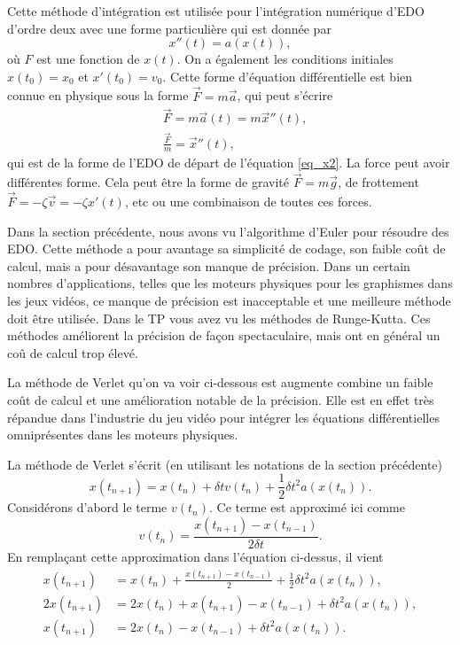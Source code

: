 \documentclass[a4paper,12pt]{book}
\renewcommand{\eqref}[1]{\ref{#1}}
\begin{document}
Cette méthode d'intégration est utilisée pour l'intégration numérique d'EDO d'ordre 
deux avec une forme particulière qui est donnée par
\begin{equation}
 x''(t)=a(x(t)),\label{eq_x2}
\end{equation}
où $F$ est une fonction de $x(t)$. On a également les conditions initiales
$x(t_0)=x_0$ et $x'(t_0)=v_0$. Cette forme d'équation différentielle
est bien connue en physique sous la forme $\vec F=m\vec a$, qui peut s'écrire
\begin{align}
 &\vec{F}=m \vec a(t)=m \vec x''(t),\nonumber\\
 &\frac{\vec{F}}{m}= \vec x''(t),
\end{align}
qui est de la forme de l'EDO de départ de l'équation \eqref{eq_x2}. La force peut 
avoir différentes forme. Cela peut être la forme de gravité $\vec F=m \vec g$, de 
frottement $\vec F=-\zeta \vec v=-\zeta x'(t)$, etc ou une combinaison de toutes ces forces.

Dans la section précédente, nous avons vu l'algorithme d'Euler pour résoudre des EDO. 
Cette méthode a pour avantage sa simplicité de codage, son faible coût de calcul, mais 
a pour désavantage son manque de précision. Dans un certain nombres d'applications, telles 
que les moteurs physiques pour les graphismes dans les jeux vidéos, ce manque de précision 
est inacceptable et une meilleure méthode doit être utilisée. Dans le TP vous avez vu les 
méthodes de Runge-Kutta. Ces méthodes améliorent la précision de façon spectaculaire, mais
ont en général un coû de calcul trop élevé.

La méthode de Verlet qu'on va voir ci-dessous est augmente combine un faible coût de calcul
et une amélioration notable de la précision. Elle est en effet très répandue dans l'industrie du jeu vidéo pour intégrer les équations différentielles omniprésentes dans les moteurs physiques.

La méthode de Verlet s'écrit (en utilisant les notations de la section précédente) 
\begin{equation}
 x(t_{n+1})=x(t_n)+\delta t v(t_n)+\frac{1}{2}\delta t^2 a(x(t_n)).\label{eq_verlet_gen}
\end{equation}
Considérons d'abord le terme $v(t_n)$. Ce terme est approximé ici comme
\begin{equation}
 v(t_n) = \frac{x(t_{n+1})-x(t_{n-1})}{2\delta t}.
\end{equation}
En remplaçant cette approximation dans l'équation ci-dessus, il vient
\begin{align}
 x(t_{n+1})&=x(t_n)+\frac{x(t_{n+1})-x(t_{n-1})}{2}+\frac{1}{2}\delta t^2 a(x(t_n)),\nonumber\\
 2x(t_{n+1})&=2x(t_n)+x(t_{n+1})-x(t_{n-1})+\delta t^2 a(x(t_n)),\nonumber\\
 x(t_{n+1})&=2x(t_n)-x(t_{n-1})+\delta t^2 a(x(t_n)).\label{eq_verlet_novel}
\end{align}
\end{document}
